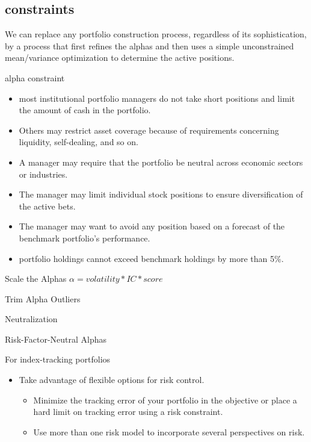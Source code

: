 \documentclass[presentation]{beamer}
\begin{document}
\subsection{constraints}
\label{sec:orgheadline11}
\alert{We can replace any portfolio construction process, regardless of its sophistication, by a process that first refines the alphas and then uses a simple unconstrained mean/variance optimization to determine the active positions.}
\begin{frame}[label={sec:orgheadline8}]{alpha constraint}
\begin{itemize}
\item most institutional portfolio managers do not take short positions and limit the amount of cash in the portfolio.
\item Others may restrict asset coverage because of requirements concerning liquidity, self-dealing, and so on.
\item A manager may require that the portfolio be neutral across economic sectors or industries.
\item The manager may limit individual stock positions to ensure diversification of the active bets.
\item The manager may want to avoid any position based on a forecast of the benchmark portfolio’s performance.
\item portfolio holdings cannot exceed benchmark holdings by more than 5\%.
\end{itemize}
\begin{block}{Scale the Alphas}
\(\alpha=volatility*IC*score\)
\end{block}
\begin{block}{Trim Alpha Outliers}
\end{block}
\begin{block}{Neutralization}
\end{block}
\begin{block}{Risk-Factor-Neutral Alphas}
\end{block}
\begin{block}{For index-tracking portfolios}
\begin{itemize}
\item Take advantage of ﬂexible options for risk control.
\begin{itemize}
\item Minimize the tracking error of your portfolio in the objective or place a hard limit on tracking error using a risk constraint.
\item Use more than one risk model to incorporate several perspectives on risk.

\end{itemize}
\end{itemize}
\end{block}
\end{frame}
\end{document}
